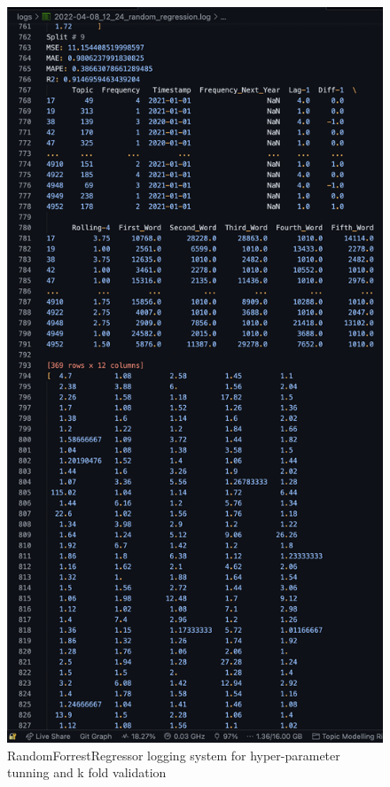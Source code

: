 \documentclass[12pt,MSc,a4paper,oneside]{muthesis}
\begin{document}
\label{appendix:13}
\begin{figure}[h]
    \centering
    \includegraphics[scale=0.5]{results/regression_log.png}
    \caption{RandomForrestRegressor logging system for hyper-parameter tunning and k fold validation}
\end{figure}

\end{document}
